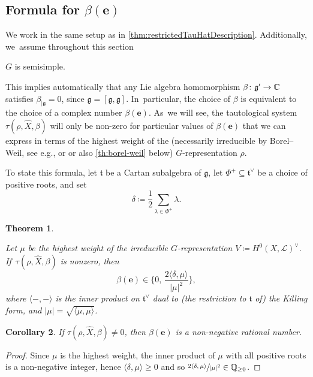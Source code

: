 \documentclass[11pt]{article}
\newcommand{\eg}{e.g.,\xspace}
\let\mathds\mathbb
\newcommand{\bme}{{\boldsymbol{e}}}
\newtheorem{thm}{Theorem}[section]
\newtheorem{cor}[thm]{Corollary}
\newcommand{\dQ}{{\mathds Q}}\let\Q\dQ
\newcommand{\frg}{\mathfrak{g}}
\newcommand\restr[2]{{#1_{| {#2}}}}
\begin{document}
\subsection{Formula for \texorpdfstring{$\beta(\bme)$}{beta(e)}}
We work in the same setup as in \cref{thm:restrictedTauHatDescription}. Additionally, we~assume throughout this section

\begin{center}
$G$ is semisimple.
\end{center}
This implies automatically that any Lie algebra homomorphism $\beta \colon \frg' \to \C$ satisfies $\restr{\beta}{\frg} = 0$, since $\frg = [\frg, \frg]$. In~particular, the choice of $\beta$ is equivalent to the choice of a complex number $\beta(\bme)$. As~we will see, the tautological system $\tau(\rho, \hat{X},\beta)$ will only be non-zero for particular values of $\beta(\bme)$ that we can express in terms of the highest weight of the (necessarily irreducible by Borel--Weil, see \eg \cite{Ser54} or \cite[Cor.\,to\,Th.\,V]{Bot57} or also \cref{th:borel-weil} below) $G$-representation $\rho$.

To state this formula, let $\mathfrak{t}$ be a Cartan subalgebra of $\mathfrak{g}$, let $\Phi^+\subseteq \mathfrak{t}^\vee$ be a choice of positive roots, and set
\[
\delta\coloneqq \frac{1}{2}\sum_{\lambda\in \Phi^+} \lambda.
\]

\begin{thm}\label{th:reptheory-beta}

Let $\mu$ be the highest weight of the irreducible $G$-representation $V\coloneqq H^0(X, \mathscr{L})^\vee$. If~$\tau(\rho,\hat{X},\beta)$ is nonzero, then
\[
\beta(\bme) \in \Big\{0, \, \frac{2\langle \delta, \mu\rangle}{|\mu|^2}\Big\},
\]
where $\langle-,-\rangle$ is the inner product on $\mathfrak{t}^\vee$ dual to (the restriction to $\mathfrak{t}$ of) the Killing form, and $|\mu|=\sqrt{\langle\mu,\mu\rangle}$.
\end{thm}

\begin{cor}\label{cor:BetaNonNeg}
If $\tau(\rho, \hat X, \beta) \neq 0$, then $\beta(\bme)$ is a non-negative rational number.
\end{cor}

\begin{proof}
Since $\mu$ is the highest weight, the inner product of $\mu$ with all positive roots is a non-negative integer, hence $\langle \delta, \mu \rangle \geq 0$ and so $\sfrac{2\langle \delta, \mu\rangle}{|\mu|^2}\in\dQ_{\geq 0}$.
\end{proof}
\end{document}

